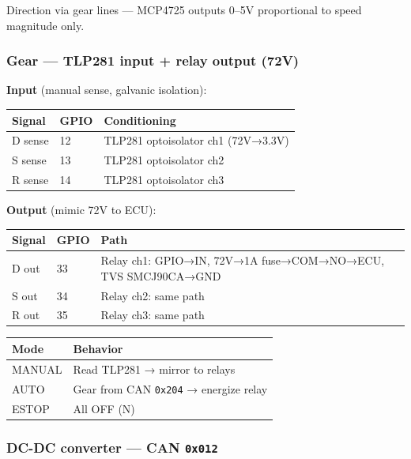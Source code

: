 \documentclass[12pt,a4paper,oneside]{report}
\begin{document}
Direction via gear lines --- MCP4725 outputs 0--5V proportional to speed
magnitude only.

\subsubsection{Gear --- TLP281 input + relay output
(72V)}\label{gear-tlp281-input-relay-output-72v}

\textbf{Input} (manual sense, galvanic isolation):

\begin{longtable}[]{@{}lll@{}}
\toprule\noalign{}
Signal & GPIO & Conditioning \\
\midrule\noalign{}
\endhead
\bottomrule\noalign{}
\endlastfoot
D sense & 12 & TLP281 optoisolator ch1 (72V→3.3V) \\
S sense & 13 & TLP281 optoisolator ch2 \\
R sense & 14 & TLP281 optoisolator ch3 \\
\end{longtable}

\textbf{Output} (mimic 72V to ECU):

\begin{longtable}[]{@{}lll@{}}
\toprule\noalign{}
Signal & GPIO & Path \\
\midrule\noalign{}
\endhead
\bottomrule\noalign{}
\endlastfoot
D out & 33 & Relay ch1: GPIO→IN, 72V→1A fuse→COM→NO→ECU, TVS SMCJ90CA→GND \\
S out & 34 & Relay ch2: same path \\
R out & 35 & Relay ch3: same path \\
\end{longtable}

\begin{longtable}[]{@{}ll@{}}
\toprule\noalign{}
Mode & Behavior \\
\midrule\noalign{}
\endhead
\bottomrule\noalign{}
\endlastfoot
MANUAL & Read TLP281 → mirror to relays \\
AUTO & Gear from CAN \texttt{0x204} → energize relay \\
ESTOP & All OFF (N) \\
\end{longtable}

\subsubsection{\texorpdfstring{DC-DC converter --- CAN
\texttt{0x012}}{DC-DC converter --- CAN 0x012}}\label{dc-dc-converter-can-0x012}
\end{document}
